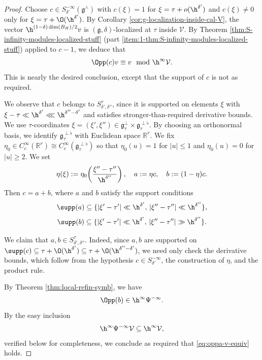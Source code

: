 \begin{proof}
  Choose $c \in S^{-\infty}_{\delta '}(\mathfrak{g}^\wedge)$ with $c(\xi) = 1$ for $\xi = \tau + o(\h^{\delta'})$ and $c(\xi) \neq 0$ only for $\xi = \tau + \O(\h^{\delta'})$.  By Corollary \ref{cor:g-localization-inside-cal-V}, the vector $\h^{(1 - \delta) \dim(B_H)/2} v$ is $(\mathfrak{g},\delta)$-localized at $\tau$ inside $\mathcal{V}$.  By Theorem \ref{thm:S-infinity-modules-localized-stuff} (part \eqref{item:1-thm:S-infinity-modules-localized-stuff}) applied to $c-1$, we deduce that
  \begin{equation*}
    \Opp(c) v \equiv v \mod{\h^\infty \mathcal{V}}.
  \end{equation*}
  This is nearly the desired conclusion, except that the support of $c$ is not as required.

  We observe that $c$ belongs to $S^{\tau}_{\delta ', \delta ''}$, since it is supported on elements $\xi$ with $\xi - \tau \ll \h^{\delta '} \lll \h^{\delta '' - \delta '}$ and satisfies stronger-than-required derivative bounds.  We use $\tau$-coordinates $\xi = (\xi ', \xi '') \in \mathfrak{g}_\tau^\perp \times \mathfrak{g}_\tau^{\perp \flat}$.  By choosing an orthonormal basis, we identify $\mathfrak{g}_{\tau}^{\perp\flat}$ with Euclidean space $\mathbb{R}^r$.  We fix $\eta_0 \in C_c^\infty(\mathbb{R}^r) \cong C_c^\infty(\mathfrak{g}_{\tau}^{\perp\flat})$ so that $\eta_0(u)=1$ for $|u| \leq 1$ and $\eta_0(u)=0$ for $|u| \geq 2$.  We set
  \[
    \eta(\xi) := \eta_0\!\left(\frac{\xi '' - \tau ''}{\h^{\delta ''}}\right), \quad
    a := \eta c, \quad b := (1-\eta)c.
  \]
  Then $c = a + b$, where $a$ and $b$ satisfy the support conditions
  \begin{equation*}
    \supp(a) \subseteq \{|\xi' - \tau'| \ll \h^{\delta'},\, |\xi'' - \tau''| \ll \h^{\delta''}\},
  \end{equation*}
  \begin{equation*}
    \supp(b) \subseteq \{|\xi' - \tau'| \ll \h^{\delta'},\, |\xi'' - \tau''| \gg \h^{\delta''}\}.
  \end{equation*}

  We claim that $a, b \in S^\tau_{\delta', \delta ''}$.  Indeed, since $a,b$ are supported on $\supp(c) \subseteq \tau + \O(\h^{\delta'}) \subseteq \tau + \O(\h^{\delta''-\delta'})$, we need only check the derivative bounds, which follow from the hypothesis $c \in S^{-\infty}_{\delta'}$, the construction of $\eta$, and the product rule.

  By Theorem \ref{thm:local-refin-symb}, we have
  \begin{equation*}
    \Opp(b) \in \h^\infty \Psi^{-\infty}.
  \end{equation*}
  By the easy inclusion
  \begin{equation}\label{eq:hinfty-psi-infty}
    \h^\infty \Psi^{-\infty} \mathcal{V} \subseteq \h^\infty \mathcal{V},
  \end{equation}
  verified below for completeness, we conclude as required that \eqref{eq:oppa-v-equiv} holds.
\end{proof}
